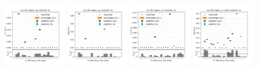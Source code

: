 \begin{figure}
    \includegraphics[width=0.24\textwidth]{chapters/Appendix/sectionTTSyst/figures/afterCorr/icata1_ch0_isr.png}
    \includegraphics[width=0.24\textwidth]{chapters/Appendix/sectionTTSyst/figures/afterCorr/icata1_ch1_isr.png}
    \includegraphics[width=0.24\textwidth]{chapters/Appendix/sectionTTSyst/figures/afterCorr/icata1_ch2_isr.png}
    \includegraphics[width=0.24\textwidth]{chapters/Appendix/sectionTTSyst/figures/afterCorr/icata1_ch3_isr.png}
    

\end{figure}
